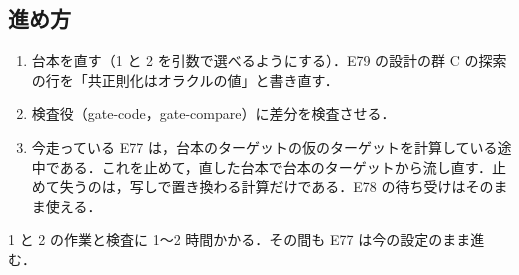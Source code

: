 \subsection{進め方}

\begin{enumerate}
\item 台本を直す（1 と 2 を引数で選べるようにする）．E79 の設計の群 C の探索の行を「共正則化はオラクルの値」と書き直す．
\item 検査役（gate-code，gate-compare）に差分を検査させる．
\item 今走っている E77 は，台本のターゲットの仮のターゲットを計算している途中である．これを止めて，直した台本で台本のターゲットから流し直す．止めて失うのは，写しで置き換わる計算だけである．E78 の待ち受けはそのまま使える．
\end{enumerate}

1 と 2 の作業と検査に 1〜2 時間かかる．その間も E77 は今の設定のまま進む．
